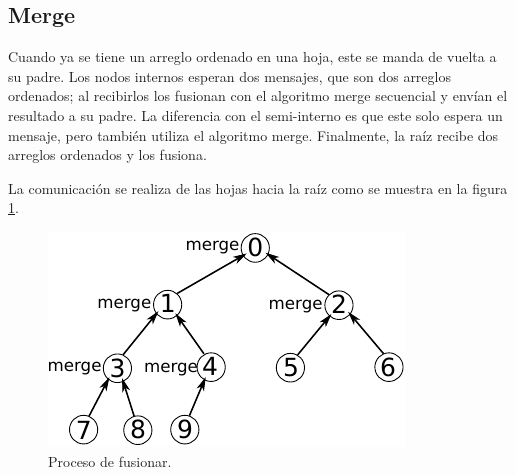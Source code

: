 \documentclass{article}
\begin{document}
\subsection*{Merge}

Cuando ya se tiene un arreglo ordenado en una hoja, este se manda de vuelta a su padre. Los nodos internos esperan dos mensajes, que son dos arreglos ordenados; al recibirlos los fusionan con el algoritmo merge secuencial y envían el resultado a su padre. La diferencia con el semi-interno es que este solo espera un mensaje, pero también utiliza el algoritmo merge. Finalmente, la raíz recibe dos arreglos ordenados y los fusiona.

La comunicación se realiza de las hojas hacia la raíz como se muestra en la figura \ref{merge}.

\begin{figure}[htbp]
\begin{center}
\includegraphics[scale=1]{red3}
\caption{Proceso de fusionar.}
\label{merge}
\end{center}
\end{figure}
\end{document}
